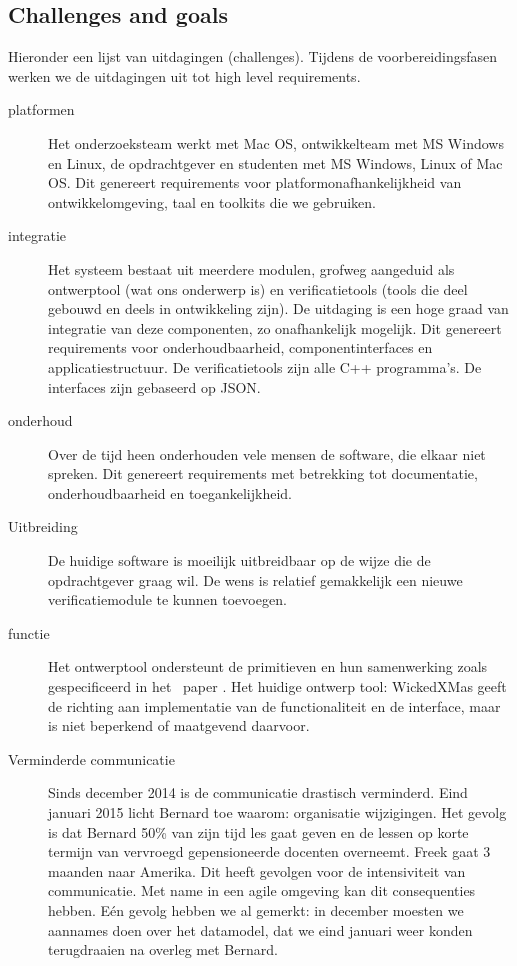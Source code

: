 \subsection{Challenges and goals}\label{sec: challenges goals}

Hieronder een lijst van uitdagingen (challenges). Tijdens de voorbereidingsfasen werken we de uitdagingen uit tot high level requirements.

\begin{description}
 \item[platformen] Het onderzoeksteam werkt met Mac OS, ontwikkelteam met MS Windows en Linux, de opdrachtgever en studenten met MS Windows, Linux of Mac OS.
		    Dit genereert requirements voor platformonafhankelijkheid van ontwikkelomgeving, taal en toolkits die we gebruiken.
 \item[integratie] Het systeem bestaat uit meerdere modulen, grofweg aangeduid als ontwerptool (wat ons onderwerp is) en verificatietools (tools die
		    deel gebouwd en deels in ontwikkeling zijn). De uitdaging is een hoge graad van integratie van deze componenten, zo onafhankelijk mogelijk.
		    Dit genereert requirements voor onderhoudbaarheid, componentinterfaces en applicatiestructuur. De verificatietools zijn alle C++ programma's.
		    De interfaces zijn gebaseerd op JSON.
 \item[onderhoud] Over de tijd heen onderhouden vele mensen de software, die elkaar niet spreken. Dit genereert requirements met betrekking tot documentatie,
		    onderhoudbaarheid en toegankelijkheid.
 \item[Uitbreiding] De huidige software is moeilijk uitbreidbaar op de wijze die de opdrachtgever graag wil. De wens is relatief gemakkelijk een nieuwe
		    verificatiemodule te kunnen toevoegen.
 \item[functie] Het ontwerptool ondersteunt de primitieven en hun samenwerking zoals gespecificeerd in het \xmas\ paper \cite{chatterjee-kishinevsky:xmas}.
		Het  huidige ontwerp tool: WickedXMas geeft de richting aan implementatie van de functionaliteit en de interface, maar is
		niet beperkend of maatgevend daarvoor.
 \item[Verminderde communicatie] 
  \begin{aanpassing1}
 Sinds december 2014 is de communicatie drastisch verminderd. Eind januari 2015 licht Bernard toe waarom: 
 organisatie wijzigingen. Het gevolg is dat Bernard 50\% van zijn tijd les gaat 
 geven en de lessen op korte termijn van vervroegd gepensioneerde docenten overneemt. 
 Freek gaat 3 maanden naar Amerika. Dit heeft gevolgen voor de intensiviteit van 
 communicatie. Met name in een agile omgeving kan dit consequenties hebben. 
 E\'{e}n gevolg hebben we al gemerkt: in december moesten we aannames doen over 
 het datamodel, dat we eind januari weer konden terugdraaien na overleg met Bernard.
 \end{aanpassing1}
\end{description}


